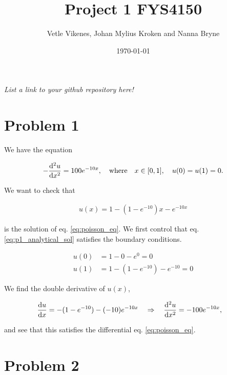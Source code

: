 \documentclass[english,notitlepage]{revtex4-1}  %
\begin{document}
\title{Project 1 FYS4150}      %
\author{Vetle Vikenes, Johan Mylius Kroken and Nanna Bryne}          %
\date{\today}                             %
\noaffiliation                            %


\maketitle 
    
\textit{List a link to your github repository here!}
    
\section*{Problem 1}

We have the equation 

\begin{align}\label{eq:poisson_eq}
    -\dv[2]{u}{x} =  100e^{-10x}, \quad \text{where} \quad x\in [0,1], \quad u(0)=u(1)=0.
\end{align}


We want to check that 

\begin{align}\label{eq:p1_analytical_sol}
    u(x) = 1 - (1-e^{-10})x - e^{-10x}
\end{align}

is the solution of eq. \ref{eq:poisson_eq}. We first control that eq. \ref{eq:p1_analytical_sol} satisfies the boundary conditions. 

\begin{align*}
    u(0) &= 1 - 0 - e^{0} = 0 \\
    u(1) &= 1 - (1-e^{-10}) - e^{-10} = 0
\end{align*}
 
We find the double derivative of $u(x)$,

\begin{align*}
    \dv{u}{x} &= -(1-e^{-10}) - (-10)e^{-10x} \quad \Rightarrow \quad \dv[2]{u}{x} = -100e^{-10x},
\end{align*}

and see that this satisfies the differential eq. \ref{eq:poisson_eq}.


\section*{Problem 2}
\end{document}
